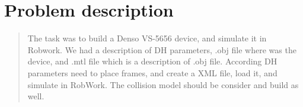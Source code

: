 \section{Problem description}
\label{sec:description}

\begin{quote}
The task was to build a Denso VS-5656 device, and simulate it in Robwork. We had a description of DH parameters, .obj file where was the 
device, and .mtl file which is a description of .obj file. According DH parameters need to place frames, and create a XML file, load it,
and simulate in RobWork. The collision model should be consider and build as well.
\end{quote}
